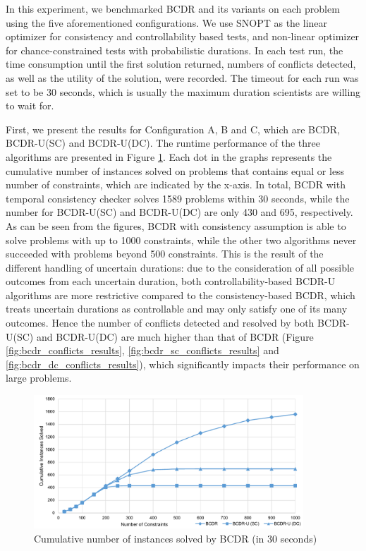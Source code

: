 \documentclass[jair,twoside,11pt,theapa]{article}
\begin{document}
In this experiment, we benchmarked BCDR and its variants on each problem using
the five aforementioned configurations. We use SNOPT as the linear optimizer for
consistency and controllability based tests, and non-linear optimizer for
chance-constrained tests with probabilistic durations. In each test run, the
time consumption until the first solution returned, numbers of conflicts
detected, as well as the utility of the solution, were recorded. The timeout for
each run was set to be 30 seconds, which is usually the maximum duration
scientists are willing to wait for.


First, we present the results for Configuration A, B and C, which are BCDR,
BCDR-U(SC) and BCDR-U(DC). The runtime performance of the three algorithms are
presented in Figure \ref{fig:bcdr_runtime_results}. Each dot in the graphs
represents the cumulative number of instances solved on problems that contains
equal or less number of constraints, which are indicated by the x-axis. In
total, BCDR with temporal consistency checker solves 1589 problems within 30
seconds, while the number for BCDR-U(SC) and BCDR-U(DC) are only 430 and 695,
respectively. As can be seen from the figures, BCDR with consistency assumption
is able to solve problems with up to 1000 constraints, while the other two
algorithms never succeeded with problems beyond 500 constraints. This is the
result of the different handling of uncertain durations: due to the
consideration of all possible outcomes from each uncertain duration, both
controllability-based BCDR-U algorithms are more restrictive compared to the
consistency-based BCDR, which treats uncertain durations as controllable and may
only satisfy one of its many outcomes. Hence the number of conflicts detected
and resolved by both BCDR-U(SC) and BCDR-U(DC) are much higher than that of BCDR
(Figure \ref{fig:bcdr_conflicts_results}, \ref{fig:bcdr_sc_conflicts_results}
and \ref{fig:bcdr_dc_conflicts_results}), which significantly impacts their
performance on large problems.


\begin{figure}[!ht]
	\centering
	\includegraphics[width=0.9\textwidth]{figures/results/bcdr_runtime.pdf}
	\caption{Cumulative number of instances solved by BCDR (in 30 seconds)}
	\label{fig:bcdr_runtime_results}
\end{figure}
\end{document}
